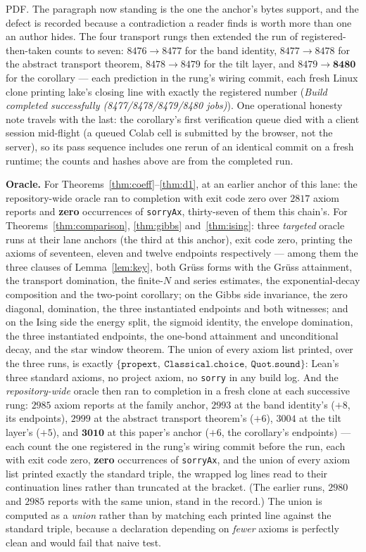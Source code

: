 \documentclass[11pt]{article}
\theoremstyle{definition}
\begin{document}
PDF.  The paragraph now standing is the one the anchor's bytes support, and
the defect is recorded because a contradiction a reader finds is worth more
than one an author hides.
The four transport rungs then extended the run of registered-then-taken
counts to seven: $8476\to8477$ for the band identity, $8477\to8478$ for
the abstract transport theorem, $8478\to8479$ for the tilt layer, and
$8479\to\mathbf{8480}$ for the corollary --- each
prediction in the rung's wiring commit, each fresh Linux clone printing
lake's closing line with exactly the registered number
(\emph{Build completed successfully (8477/8478/8479/8480 jobs)}).  One
operational honesty note travels with the last: the corollary's first
verification queue died with a client session mid-flight (a queued Colab
cell is submitted by the browser, not the server), so its pass sequence
includes one rerun of an identical commit on a fresh runtime; the
counts and hashes above are from the completed run.

\textbf{Oracle.}  For Theorems~\ref{thm:coeff}--\ref{thm:d1}, at an earlier
anchor of this lane: the repository-wide oracle ran to completion with exit
code zero over $2817$ axiom reports and \textbf{zero} occurrences of
\texttt{sorryAx}, thirty-seven of them this chain's.  For
Theorems~\ref{thm:comparison}, \ref{thm:gibbs} and~\ref{thm:ising}: three
\emph{targeted} oracle
runs at their lane anchors (the third at this anchor), exit code zero,
printing the axioms of seventeen, eleven and twelve endpoints respectively
--- among them the three clauses of
Lemma~\ref{lem:key}, both Gr\"uss forms with the Gr\"uss attainment, the
transport domination, the finite-$N$ and series estimates, the
exponential-decay composition and the two-point corollary; on the Gibbs
side invariance, the zero diagonal, domination, the three instantiated
endpoints and both witnesses; and on the Ising side the energy split, the
sigmoid identity, the envelope domination, the three instantiated endpoints,
the one-bond attainment and unconditional decay, and the star window
theorem.  The union of every axiom list printed, over the three
runs, is exactly $\{\texttt{propext},\allowbreak\
\texttt{Classical.choice},\allowbreak\ \texttt{Quot.sound}\}$: Lean's three
standard axioms, no project axiom, no \texttt{sorry} in any build log.
And the \emph{repository-wide} oracle then ran to completion in a fresh
clone at each successive rung: $2985$ axiom reports at the family anchor,
$2993$ at the band identity's ($+8$, its endpoints), $2999$ at the abstract
transport theorem's ($+6$), $3004$ at the tilt layer's ($+5$), and
$\mathbf{3010}$ at this paper's anchor ($+6$, the corollary's
endpoints) --- each count the one registered in the rung's
wiring commit before the run, each with exit code zero, \textbf{zero}
occurrences of \texttt{sorryAx}, and the union of every axiom list printed
exactly the standard triple, the wrapped log lines read to their
continuation lines rather than truncated at the bracket.  (The earlier
runs, $2980$ and $2985$ reports with the same union, stand in the
record.)  The
union is computed as a \emph{union} rather than by matching each printed line
against the standard triple, because a declaration depending on \emph{fewer}
axioms is perfectly clean and would fail that naive test.
\end{document}

